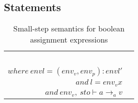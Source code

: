 \subsection{Statements}
\begin{table}[H]
    \centering
    \begin{longtable}[c] { r c }
    \begin{tabular}{@{}c@{}} 
    [ASS1] \\
    \newline \\
    \newline \\
    \newline \\
    \end{tabular}
  \begin{tabular}{@{}c@{}}   \( \langle x := a, sto, envl \rangle \Rightarrow (sto[l \mapsto v], envl) \)  \\ \( where \ envl  = (env_v, env_p) : envl' \)
  \\ \( and \ l = env_v x \)
  \\ \( and \ env_v, \ sto \vdash a \rightarrow_a v \)
  \end{tabular}
        
 \end{longtable}
    \caption{Small-step semantics for boolean assignment expressions}\label{sem:bool-ass}
\end{table}
        

